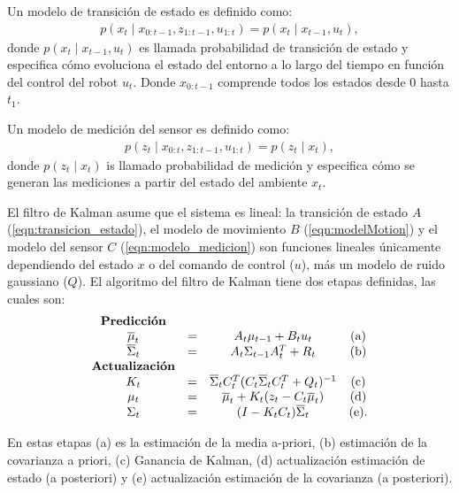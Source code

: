 Un modelo de transici\'on de estado es definido como:
\begin{align}
\label{eqn:transicion_estado}
p(x_{t}\mid x_{0:t-1}, z_{1:t-1}, u_{1:t}) = p(x_{t}\mid x_{t-1}, u_{t}),
\end{align}
donde $p(x_{t}\mid x_{t-1}, u_{t})$ es llamada probabilidad de transición de estado 
y especifica cómo evoluciona el estado del entorno a lo largo del tiempo en función 
del control del robot $u_{t}$. Donde $x_{0:t-1}$ comprende todos los estados desde 
$0$ hasta $t_1$. 

Un modelo de medici\'on del sensor es definido como:
\begin{align}
\label{eqn:modelo_medicion}
p(z_{t}\mid x_{0:t}, z_{1:t-1}, u_{1:t}) = p (z_{t}\mid x_{t}),
\end{align}
donde $p(z_{t}\mid x_{t})$ is llamado probabilidad de medición y especifica cómo se 
generan las mediciones a partir del estado del ambiente $x_{t}$.

El filtro de Kalman asume que el sistema es lineal: la transición de estado 
$A$ (\ref{eqn:transicion_estado}), el modelo de movimiento $B$ (\ref{eqn:modelMotion})  
y el modelo del sensor $C$ (\ref{eqn:modelo_medicion}) son funciones lineales únicamente 
dependiendo del estado $x$ o del comando de control ($u$), más un modelo 
de ruido gaussiano ($Q$). El algoritmo del filtro de Kalman tiene dos etapas 
definidas, las cuales son:
\begin{equation*}
\label{eqn: Kalman Filter}
\begin{matrix}
\textrm{\textbf{Predicción}}\\
\overline{\mu}_{t} &= &A_{t}\mu_{t-1} + B_{t} u_{t} &\textrm{(a)}\\
\overline{\Sigma}_{t} &= &A_{t}\Sigma_{t-1} A_{t}^{T} + R_{t} &\textrm{(b)}\\
\textrm{\textbf{Actualización}}\\
K_{t} &= &\overline{\Sigma}_{t}C_{t}^{T}(C_{t}\overline{\Sigma}_{t}C_{t}^{T} + Q_{t})^{-1} &\textrm{(c)}\\
\mu_{t} &= &\overline{\mu}_{t} + K_{t}(z_{t} - C_{t}\overline{\mu}_{t}) &\textrm{(d)}\\
\Sigma_{t} &= &(I - K_{t}C_{t})\overline{\Sigma}_{t} &\textrm{(e)}.\\
\end{matrix}
\end{equation*}

En estas etapas (a) es la estimación de la media a-priori, (b) estimación de la 
covarianza a priori, (c) Ganancia de Kalman, (d) actualización estimación de 
estado (a posteriori) y (e) actualización estimación de la covarianza (a posteriori).

